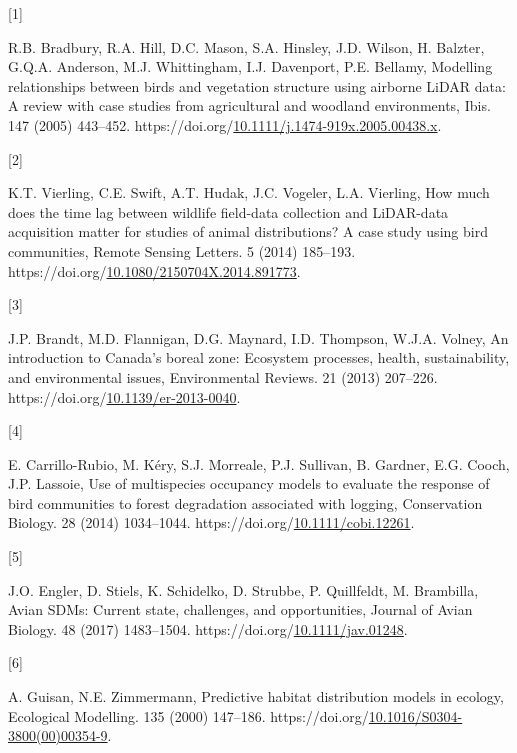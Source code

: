 \documentclass[manuscript, 3p, authoryear]{elsarticle} %
\newlength{\cslhangindent}
\newlength{\csllabelwidth}
\newlength{\cslentryspacingunit} %
\newenvironment{CSLReferences}[2] %
 {%
  \setlength{\parindent}{0pt}
  \ifodd #1
  \let\oldpar\par
  \def\par{\hangindent=\cslhangindent\oldpar}
  \fi
  \setlength{\parskip}{#2\cslentryspacingunit}
 }%
 {}
\newcommand{\CSLLeftMargin}[1]{\parbox[t]{\csllabelwidth}{#1}}
\newcommand{\CSLRightInline}[1]{\parbox[t]{\linewidth - \csllabelwidth}{#1}\break}
\begin{document}
\hypertarget{refs}{}
\begin{CSLReferences}{0}{0}
\leavevmode{}%
\CSLLeftMargin{{[}1{]} }%
\CSLRightInline{R.B. Bradbury, R.A. Hill, D.C. Mason, S.A. Hinsley, J.D. Wilson, H. Balzter, G.Q.A. Anderson, M.J. Whittingham, I.J. Davenport, P.E. Bellamy, Modelling relationships between birds and vegetation structure using airborne {LiDAR} data: A review with case studies from agricultural and woodland environments, Ibis. 147 (2005) 443--452. https://doi.org/\href{https://doi.org/10.1111/j.1474-919x.2005.00438.x}{10.1111/j.1474-919x.2005.00438.x}.}

\leavevmode{}%
\CSLLeftMargin{{[}2{]} }%
\CSLRightInline{K.T. Vierling, C.E. Swift, A.T. Hudak, J.C. Vogeler, L.A. Vierling, How much does the time lag between wildlife field-data collection and {LiDAR-data} acquisition matter for studies of animal distributions? {A} case study using bird communities, Remote Sensing Letters. 5 (2014) 185--193. https://doi.org/\href{https://doi.org/10.1080/2150704X.2014.891773}{10.1080/2150704X.2014.891773}.}

\leavevmode{}%
\CSLLeftMargin{{[}3{]} }%
\CSLRightInline{J.P. Brandt, M.D. Flannigan, D.G. Maynard, I.D. Thompson, W.J.A. Volney, An introduction to {Canada}'s boreal zone: {Ecosystem} processes, health, sustainability, and environmental issues, Environmental Reviews. 21 (2013) 207--226. https://doi.org/\href{https://doi.org/10.1139/er-2013-0040}{10.1139/er-2013-0040}.}

\leavevmode{}%
\CSLLeftMargin{{[}4{]} }%
\CSLRightInline{E. Carrillo-Rubio, M. Kéry, S.J. Morreale, P.J. Sullivan, B. Gardner, E.G. Cooch, J.P. Lassoie, Use of multispecies occupancy models to evaluate the response of bird communities to forest degradation associated with logging, Conservation Biology. 28 (2014) 1034--1044. https://doi.org/\href{https://doi.org/10.1111/cobi.12261}{10.1111/cobi.12261}.}

\leavevmode{}%
\CSLLeftMargin{{[}5{]} }%
\CSLRightInline{J.O. Engler, D. Stiels, K. Schidelko, D. Strubbe, P. Quillfeldt, M. Brambilla, Avian {SDMs}: Current state, challenges, and opportunities, Journal of Avian Biology. 48 (2017) 1483--1504. https://doi.org/\href{https://doi.org/10.1111/jav.01248}{10.1111/jav.01248}.}

\leavevmode{}%
\CSLLeftMargin{{[}6{]} }%
\CSLRightInline{A. Guisan, N.E. Zimmermann, Predictive habitat distribution models in ecology, Ecological Modelling. 135 (2000) 147--186. https://doi.org/\href{https://doi.org/10.1016/S0304-3800(00)00354-9}{10.1016/S0304-3800(00)00354-9}.}


\end{CSLReferences}
\end{document}
